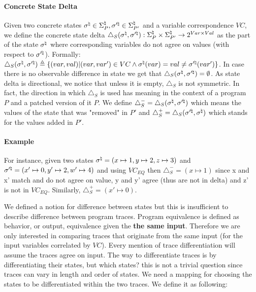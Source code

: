 \paragraph{Concrete State Delta} 
Given two concrete states $\sigma^\natural \in \Sigma_{P}^\natural,\sigma'^\natural \in \Sigma_{P'}^\natural$ and a variable correspondence $VC$, we define the concrete state delta $\triangle_{S}(\sigma^\natural,\sigma'^\natural) : \Sigma^\natural_{P} \times \Sigma^\natural_{P'} \rightarrow 2^{Var \times Val}$ as the part of the state $\sigma^\natural$ where corresponding variables do not agree on values (with respect to $\sigma'^\natural$). Formally: $\triangle_{S}(\sigma^\natural,\sigma'^\natural) \triangleq \{ (var,val) | (var,var') \in VC \wedge \sigma^\natural(var) = val \neq \sigma'^\natural(var')\}$. In case there is no observable difference in state we get that $\triangle_{S}(\sigma^\natural,\sigma'^\natural) = \emptyset$. As state delta is directional, we notice that unless it is empty, $\triangle_{S}$ is not symmetric. In fact, the direction in which $\triangle_{S}$ is used has meaning in the context of a program $P$ and a patched version of it $P$. We define $\triangle_{S}^{-} = \triangle_{S}(\sigma^\natural,\sigma'^\natural)$ which means the values of the state that was "removed" in $P'$ and $\triangle_{S}^{+} = \triangle_{S}(\sigma'^\natural,\sigma^\natural)$ which stands for the values added in $P'$.

\paragraph{Example} For instance, given two states $\sigma^\natural = (x \mapsto 1,y \mapsto 2,z \mapsto 3)$ and $\sigma'^\natural = (x' \mapsto 0,y' \mapsto 2,w' \mapsto 4)$ and using $VC_{EQ}$ then $\triangle_{S}^{-} = (x \mapsto 1)$ since x and x' match and do not agree on value, y and y' agree (thus are not in delta) and z' is not in $VC_{EQ}$. Similarly, $\triangle_{S}^{+} = (x' \mapsto 0)$. %

We defined a notion for difference between states but this is insufficient to describe difference between program traces. Program equivalence is defined as behavior, or output, equivalence given the \textbf{the same input}. Therefore we are only interested in comparing traces that originate from the same input (for the input variables correlated by $VC$). Every mention of trace differentiation will assume the traces agree on input. The way to differentiate traces is by differentiating their states, but which states? this is not a trivial question since traces can vary in length and order of states. We need a mapping for choosing the states to be differentiated within the two traces. We define it as following:

